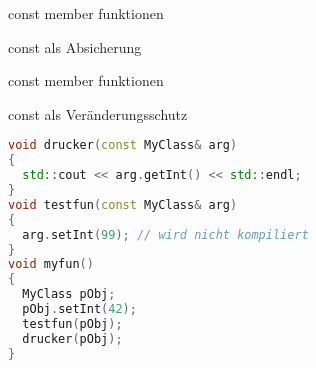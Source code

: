 
\begin{frame}[fragile]{const member funktionen}

\begin{block}{const als Absicherung}
  
\end{block}

\end{frame}

\begin{frame}[fragile]{const member funktionen}

\begin{block}{const als Veränderungsschutz}
\begin{small}
	\begin{lstlisting}[language=C++]
void drucker(const MyClass& arg)
{
  std::cout << arg.getInt() << std::endl;
}
void testfun(const MyClass& arg)
{
  arg.setInt(99); // wird nicht kompiliert
}
void myfun()
{
  MyClass pObj;
  pObj.setInt(42);
  testfun(pObj);
  drucker(pObj);
}
	\end{lstlisting}
	\end{small}
\end{block}

\end{frame}
